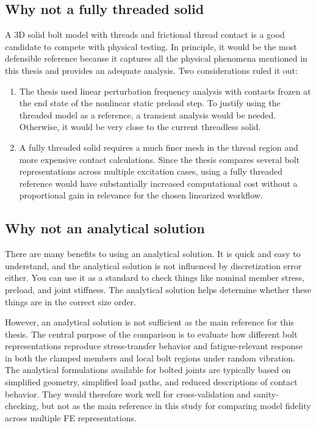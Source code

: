 \documentclass[a4paper,twoside]{bth}
\begin{document}
\subsection{Why not a fully threaded solid}
A 3D solid bolt model with threads and frictional thread contact is a good candidate to compete with physical testing. In principle, it would be the most defensible reference because it captures all the physical phenomena mentioned in this thesis and provides an adequate analysis. Two considerations ruled it out:
\begin{enumerate}
    \item The thesis used linear perturbation frequency analysis with contacts frozen at the end state of the nonlinear static preload step. To justify using the threaded model as a reference, a transient analysis would be needed. Otherwise, it would be very close to the current threadless solid.
    \item A fully threaded solid requires a much finer mesh in the thread region and more expensive contact calculations. Since the thesis compares several bolt representations across multiple excitation cases, using a fully threaded reference would have substantially increased computational cost without a proportional gain in relevance for the chosen linearized workflow.
\end{enumerate}

\newpage

\subsection{Why not an analytical solution}
There are many benefits to using an analytical solution. It is quick and easy to understand, and the analytical solution is not influenced by discretization error either. You can use it as a standard to check things like nominal member stress, preload, and joint stiffness. The analytical solution helps determine whether these things are in the correct size order.

However, an analytical solution is not sufficient as the main reference for this thesis. The central purpose of the comparison is to evaluate how different bolt representations reproduce stress-transfer behavior and fatigue-relevant response in both the clamped members and local bolt regions under random vibration. The analytical formulations available for bolted joints are typically based on simplified geometry, simplified load paths, and reduced descriptions of contact behavior. They would therefore work well for cross-validation and sanity-checking, but not as the main reference in this study for comparing model fidelity across multiple \ac{FE} representations.
\end{document}

